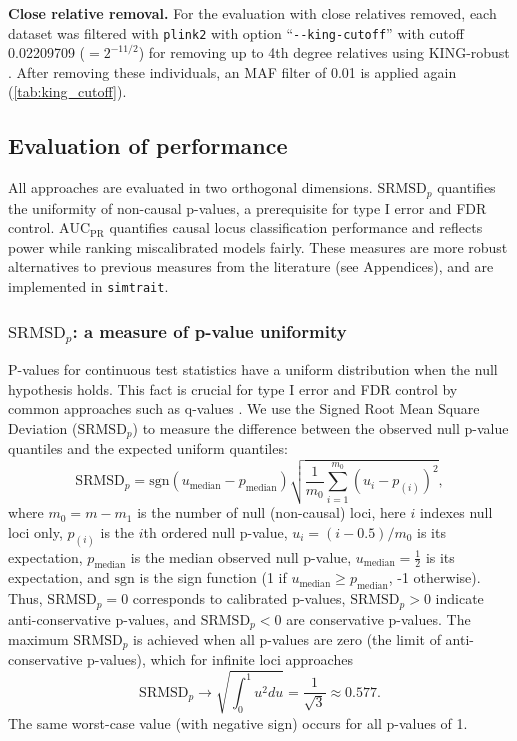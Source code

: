 \documentclass[11pt]{article}
\newcommand{\rmsd}{\text{SRMSD}_p}
\newcommand{\auc}{\text{AUC}_\text{PR}}
\begin{document}
\textbf{Close relative removal.}
For the evaluation with close relatives removed, each dataset was filtered with \texttt{plink2} with option ``\texttt{-{}-king-cutoff}'' with cutoff 0.02209709 ($= 2^{-11/2}$) for removing up to 4th degree relatives using KING-robust \citep{manichaikul_robust_2010}.
After removing these individuals, an MAF filter of 0.01 is applied again (\cref{tab:king_cutoff}).

\subsection{Evaluation of performance}

All approaches are evaluated in two orthogonal dimensions.
$\rmsd$ quantifies the uniformity of non-causal p-values, a prerequisite for type I error and FDR control.
$\auc$ quantifies causal locus classification performance and reflects power while ranking miscalibrated models fairly.
These measures are more robust alternatives to previous measures from the literature (see Appendices), and are implemented in \texttt{simtrait}.

\subsubsection{$\rmsd$: a measure of p-value uniformity}

P-values for continuous test statistics have a uniform distribution when the null hypothesis holds.
This fact is crucial for type I error and FDR control by common approaches such as q-values \citep{storey_positive_2003, storey_statistical_2003}.
We use the Signed Root Mean Square Deviation ($\rmsd$) to measure the difference between the observed null p-value quantiles and the expected uniform quantiles:
$$
\rmsd
=
\text{sgn}(u_\text{median} - p_\text{median} ) \sqrt{ \frac{1}{m_0} \sum_{i = 1}^{m_0} \left( u_i - p_{(i)} \right)^2 },
$$
where
$m_0 = m - m_1$ is the number of null (non-causal) loci,
here $i$ indexes null loci only,
$p_{(i)}$ is the $i$th ordered null p-value,
$u_i = ( i - 0.5 ) / m_0$ is its expectation,
$p_\text{median}$ is the median observed null p-value,
$u_\text{median} = \frac{1}{2}$ is its expectation,
and $\text{sgn}$ is the sign function (1 if $u_\text{median} \ge p_\text{median}$, -1 otherwise).
Thus, $\rmsd = 0$ corresponds to calibrated p-values, $\rmsd > 0$ indicate anti-conservative p-values, and $\rmsd < 0$ are conservative p-values.
The maximum $\rmsd$ is achieved when all p-values are zero (the limit of anti-conservative p-values), which for infinite loci approaches
$$
\rmsd
\rightarrow
\sqrt{ \int_0^1 u^2 du }
=
\frac{1}{ \sqrt{ 3 } }
\approx
0.577
.
$$
The same worst-case value (with negative sign) occurs for all p-values of 1.
\end{document}
